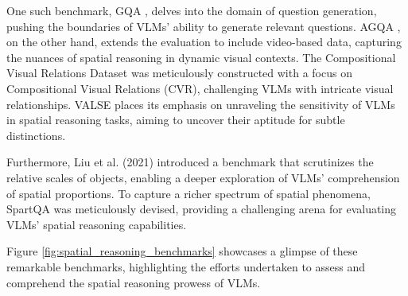 \documentclass[journal,10pt]{IEEEtran}
\begin{document}
One such benchmark, GQA \cite{hudson2019gqa}, delves into the domain of question generation, pushing the boundaries of VLMs' ability to generate relevant questions. AGQA \cite{grunde2021agqa}, on the other hand, extends the evaluation to include video-based data, capturing the nuances of spatial reasoning in dynamic visual contexts. The Compositional Visual Relations Dataset \cite{zerroug2022benchmark} was meticulously constructed with a focus on Compositional Visual Relations (CVR), challenging VLMs with intricate visual relationships. VALSE \cite{parcalabescu2021valse} places its emphasis on unraveling the sensitivity of VLMs in spatial reasoning tasks, aiming to uncover their aptitude for subtle distinctions.

Furthermore, Liu et al. (2021) introduced a benchmark \cite{liu2022things} that scrutinizes the relative scales of objects, enabling a deeper exploration of VLMs' comprehension of spatial proportions. To capture a richer spectrum of spatial phenomena, SpartQA \cite{mirzaee2021spartqa} was meticulously devised, providing a challenging arena for evaluating VLMs' spatial reasoning capabilities.

Figure \ref{fig:spatial_reasoning_benchmarks} showcases a glimpse of these remarkable benchmarks, highlighting the efforts undertaken to assess and comprehend the spatial reasoning prowess of VLMs.
\end{document}
